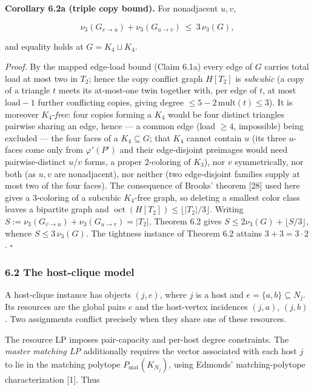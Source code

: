 \documentclass[english,11pt,a4paper]{article}
\begin{document}
\textbf{Corollary 6.2a (triple copy bound).} For nonadjacent \(u,v\),

\[
\nu_3(G_{v\to u})+\nu_3(G_{u\to v})\ \le\ 3\,\nu_3(G),
\]

and equality holds at \(G=K_4\sqcup K_4\).

\emph{Proof.} By the mapped edge-load bound (Claim 6.1a) every edge of
\(G\) carries total load at most two in \(T_2\); hence the copy conflict
graph \(H[T_2]\) is \emph{subcubic} (a copy of a triangle \(t\) meets
its at-most-one twin together with, per edge of \(t\), at most
\(\mathrm{load}-1\) further conflicting copies, giving degree
\(\le 5-2\,\mathrm{mult}(t)\le 3\)). It is moreover \(K_4\)-\emph{free}:
four copies forming a \(K_4\) would be four distinct triangles pairwise
sharing an edge, hence --- a common edge (load \(\ge 4\), impossible)
being excluded --- the four faces of a \(K_4\subseteq G\); that \(K_4\)
cannot contain \(u\) (its three \(u\)-faces come only from
\(\varphi'(P')\) and their edge-disjoint preimages would need
pairwise-distinct \(u\)/\(v\) forms, a proper \(2\)-coloring of
\(K_3\)), nor \(v\) symmetrically, nor both (as \(u,v\) are
nonadjacent), nor neither (two edge-disjoint families supply at most two
of the four faces). The consequence of Brooks' theorem {[}28{]} used
here gives a \(3\)-coloring of a subcubic \(K_4\)-free graph, so
deleting a smallest color class leaves a bipartite graph and
\(\operatorname{oct}(H[T_2])\le\lfloor|T_2|/3\rfloor\). Writing
\(S:=\nu_3(G_{v\to u})+\nu_3(G_{u\to v})=|T_2|\), Theorem 6.2 gives
\(S\le 2\nu_3(G)+\lfloor S/3\rfloor\), whence \(S\le 3\,\nu_3(G)\). The
tightness instance of Theorem 6.2 attains \(3+3=3\cdot 2\). \(\square\)

\subsubsection{6.2 The host-clique model}\label{the-host-clique-model}

A host-clique instance has objects \((j,e)\), where \(j\) is a host and
\(e=\{a,b\}\subseteq N_j\). Its resources are the global pairs \(e\) and
the host-vertex incidences \((j,a)\), \((j,b)\). Two assignments
conflict precisely when they share one of these resources.

The resource LP imposes pair-capacity and per-host degree constraints.
The \emph{master matching LP} additionally requires the vector
associated with each host \(j\) to lie in the matching polytope
\(P_{\mathrm{mat}}(K_{N_j})\), using Edmonds' matching-polytope
characterization {[}1{]}. Thus
\end{document}
